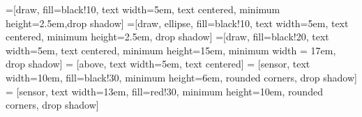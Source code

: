 \newcommand{\mx}[1]{\mathbf{\bm{#1}}} %
\newcommand{\vc}[1]{\mathbf{\bm{#1}}} %



=[draw, fill=black!10, text width=5em,
    text centered, minimum height=2.5em,drop shadow]
=[draw, ellipse, fill=black!10, text width=5em,
    text centered, minimum height=2.5em, drop shadow]
=[draw, fill=black!20, text width=5em,
    text centered, minimum height=15em, minimum width = 17em, drop shadow]
 = [above, text width=5em, text centered]
 = [sensor, text width=10em, fill=black!30,
    minimum height=6em, rounded corners, drop shadow]
 = [sensor, text width=13em, fill=red!30,
    minimum height=10em, rounded corners, drop shadow]


\def\blockdist{1.5}
\def\edgedist{2.5}

